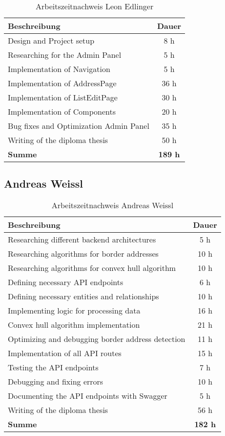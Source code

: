 \begin{table}[H]
  \centering
  \begin{tabular}{|p{10cm}|c|}
  \hline
  \textbf{Beschreibung}  & \textbf{Dauer}  \\ \hline
  Design and Project setup & 8 h \\ \hline
  Researching for the Admin Panel & 5 h \\ \hline
  Implementation of Navigation & 5 h \\ \hline
  Implementation of AddressPage & 36 h \\ \hline
  Implementation of ListEditPage & 30 h \\ \hline
  Implementation of Components & 20 h \\ \hline
  Bug fixes and Optimization Admin Panel & 35 h \\ \hline
  Writing of the diploma thesis & 50 h \\ \hline
  {\textbf{Summe}} & \textbf{189 h} \\ \hline
  \end{tabular}
  \caption{Arbeitszeitnachweis Leon Edlinger}
\end{table}

\newpage

\subsection{Andreas Weissl}

\begin{table}[H]
  \centering
  \begin{tabular}{|p{10cm}|c|}
  \hline
  \textbf{Beschreibung}  & \textbf{Dauer}  \\ \hline
    Researching different backend architectures & 5 h \\ \hline
    Researching algorithms for border addresses & 10 h \\ \hline
    Researching algorithms for convex hull algorithm & 10 h \\ \hline
    Defining necessary API endpoints & 6 h \\ \hline
    Defining necessary entities and relationships & 10 h \\ \hline
    Implementing logic for processing data & 16 h \\ \hline
    Convex hull algorithm implementation & 21 h \\ \hline
    Optimizing and debugging border address detection & 11 h \\ \hline
    Implementation of all API routes & 15 h \\ \hline
    Testing the API endpoints & 7 h \\ \hline
    Debugging and fixing errors & 10 h \\ \hline
    Documenting the API endpoints with Swagger & 5 h \\ \hline
    Writing of the diploma thesis & 56 h \\ \hline
    {\textbf{Summe}} & \textbf{182 h} \\ \hline
   \end{tabular}
  \caption{Arbeitszeitnachweis Andreas Weissl}
\end{table}

\newpage
